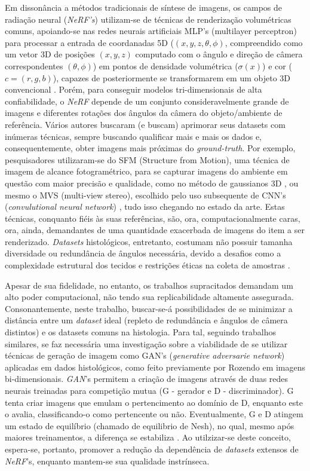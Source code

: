 Em dissonância a métodos tradicionais de síntese de imagens, os campos de radiação neural (\textit{NeRF's}) utilizam-se de técnicas de renderização volumétricas comuns, apoiando-se nas redes neurais artificiais MLP's (multilayer perceptron) para processar a entrada de coordanadas 5D ($(x, y, z, \theta, \phi)$, compreendido como um vetor 3D de posições $(x, y, z)$ computado com o ângulo e direção de câmera correspondentes $(\theta, \phi)$) em pontos de densidade volumétrica ($\sigma (x)$) e cor ($c = (r, g, b)$), capazes de posteriormente se transformarem em um objeto 3D convencional \cite{mildenhall2020nerfrepresentingscenesneural}. Porém, para conseguir modelos tri-dimensionais de alta confiabilidade, o \textit{NeRF} depende de um conjunto consideravelmente grande de imagens e diferentes rotações dos ângulos da câmera do objeto/ambiente de referência. Vários autores buscaram (e buscam) aprimorar seus datasets com inúmeras técnicas, sempre buscando qualificar mais e mais os dados e, consequentemente, obter imagens mais próximas do \textit{ground-truth}. Por exemplo, pesquisadores utilizaram-se do SFM  (Structure from Motion), uma técnica de imagem de alcance fotogramétrico, para se capturar imagens do ambiente em questão com maior precisão e qualidade, como no método de gaussianos 3D \cite{kerbl3Dgaussians}, ou mesmo o MVS (multi-view stereo), escolhido pelo uso subsequente de CNN's (\textit{convulutional neural network}) \cite{chen2021mvsnerffastgeneralizableradiance}, tudo isso chegando no estado da arte. Estas técnicas, conquanto fiéis às suas referências, são, ora, computacionalmente caras, ora, ainda, demandantes de uma quantidade exacerbada de imagens do item a ser renderizado. \textit{Datasets} histológicos, entretanto, costumam não possuir tamanha diversidade ou redundância de ângulos necessária, devido a desafios como a complexidade estrutural dos tecidos e restrições éticas na coleta de amostras \cite{XUE2021101816}.

Apesar de sua fidelidade, no entanto, os trabalhos supracitados demandam um alto poder computacional, não tendo sua replicabilidade altamente assegurada. Consonantemente, neste trabalho, buscar-se-á possibilidades de se minimizar a distância entre um \textit{dataset} ideal (repleto de redundância e ângulos de câmera distintos) e os datasets comuns na histologia. Para tal, seguindo trabalhos similares, se faz necessária uma investigação sobre a viabilidade de se utilizar técnicas de geração de imagem como GAN's (\textit{generative adversarie network}) aplicadas em dados histológicos, como feito previamente por Rozendo \cite{rozendo2024histdataaug} em imagens bi-dimensionais.   \textit{GAN}'s  permitem a criação de imagens através de duas redes neurais treinadas para competição mutua (G - gerador e  D - discriminador). G tenta criar imagens que emulam o pertencimento ao domínio de D, enquanto este o avalia, classificando-o como pertencente ou não. Eventualmente, G e D atingem um estado de equilíbrio (chamado de equilibrio de Nesh), no qual, mesmo após maiores treinamentos, a diferença se estabiliza \cite{goodfellow2014generativeadversarialnetworks} . Ao utilzizar-se deste conceito, espera-se, portanto, promover a redução da dependência de \textit{datasets} extensos de \textit{NeRF}'s, enquanto mantem-se sua qualidade instrínseca.
